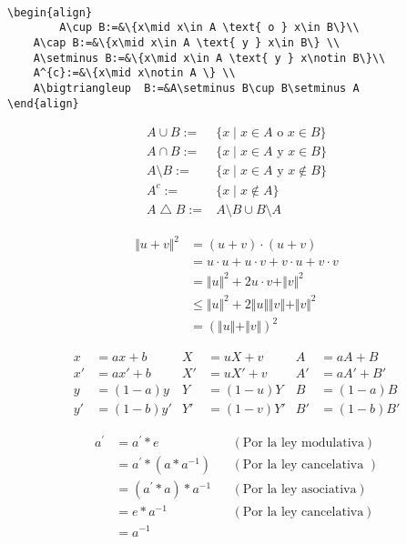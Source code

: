 \documentclass[12pt]{book}
\newcommand{\Norma}[1]{\Vert#1\Vert}
\begin{document}
\begin{verbatim}
    
\begin{align}
		A\cup B:=&\{x\mid x\in A \text{ o } x\in B\}\\
	A\cap B:=&\{x\mid x\in A \text{ y } x\in B\} \\
	A\setminus B:=&\{x\mid x\in A \text{ y } x\notin B\}\\
	A^{c}:=&\{x\mid x\notin A \} \\
	A\bigtriangleup  B:=&A\setminus B\cup B\setminus A
\end{align}

\end{verbatim}
\begin{align}
		A\cup B:=&\{x\mid x\in A \text{ o } x\in B\}\\
	A\cap B:=&\{x\mid x\in A \text{ y } x\in B\} \\
	A\setminus B:=&\{x\mid x\in A \text{ y } x\notin B\}\\
	A^{c}:=&\{x\mid x\notin A \} \\
	A\bigtriangleup  B:=&A\setminus B\cup B\setminus A
\end{align}


\begin{align*}
	\Norma{u+v}^{2}&=(u+v)\cdot(u+v)\\ 
	                                      &=u\cdot u+u\cdot v+v\cdot u+v\cdot v \\
	                                      &=\Norma{u}^{2}+2 u\cdot v+\Norma{v}^{2}\\
	                                      &\leq \Norma{u}^{2}+2 \Norma{u}\Norma{v}+\Norma{v}^{2}\\
	                                      &=\left(\Norma{u}+\Norma{v}\right)^{2}
\end{align*}



\begin{align*}
x &= ax+b & X&= uX+v & A&= aA+B\\
x' &= ax'+b & X' &= uX'+v & A' &= aA'+B'\\
y&= (1-a)y & Y&= (1-u)Y & B &= (1-a)B\\
y' &= (1-b)y' & Y' &= (1-v)Y' & B' &= (1-b)B'
\end{align*}


\begin{align*}
	a^{\prime}& =a^{\prime}*e    && (\text{Por la ley modulativa}) \\
	&= a^{\prime}*(a*a^{-1})   & & (\text{Por la ley cancelativa })\\
	&=(a^{\prime}*a)*a^{-1} & & (\text{Por la ley asociativa}) \\
	&=e*a^{-1}  && (\text{Por la ley cancelativa})\\
	&=a^{-1}
\end{align*}
\end{document}

